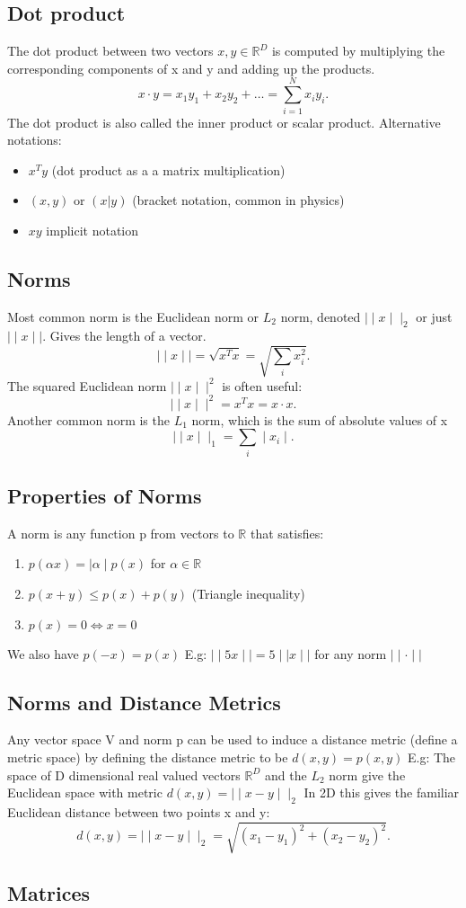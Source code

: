 \documentclass[a4paper]{article}
\newcommand{\R}{\mathbb{R}}
\begin{document}
	\subsection{Dot product}
	The dot product between two vectors $x,y \in \R^D$ is computed by multiplying the
	corresponding components of x and y and adding up the products.
	\[
	x\cdot y = x_1 y_1 + x_2 y_2 + \ldots = \sum_{i=1}^{N} x_i y_i
	.\] 
	The dot product is also called the inner product or scalar product.
	Alternative notations:
	 \begin{itemize}
		 \item $x^T y$ (dot product as a a matrix multiplication)
		 \item $(x,y)$ or $(x|y)$ (bracket notation, common in physics)
		 \item $xy$ implicit notation
	\end{itemize}
	\subsection{Norms}
	Most common norm is the Euclidean norm or $L_2$ norm, denoted $\mid\mid x\mid\mid_2$
	or just $ \mid  \mid x \mid  \mid $.
	Gives the length of a vector.
	\[
	\mid  \mid x \mid  \mid = \sqrt{x^T x} = \sqrt{\sum_{i}x_i^2} 
	.\] 
	The squared Euclidean norm $ \mid  \mid x \mid  \mid^2$ is often useful:
	\[
	 \mid  \mid x \mid  \mid^2 = x^Tx = x\cdot x
	.\] 
	Another common norm is the $L_1$ norm, which is the sum of absolute values of x
	\[
		\mid  \mid x \mid  \mid_1 = \sum_{i} \mid x_i \mid 
	.\] 
	\subsection{Properties of Norms}
	A norm is any function p from vectors to $\R$ that satisfies:
	\begin{enumerate}
		\item $p(\alpha x) =  \mid \alpha  \mid p(x)$ for $\alpha \in \R$ 
		\item $p(x+y) \le p(x) + p(y)$ (Triangle inequality)
		\item $p(x) = 0 \iff x = 0$
	\end{enumerate}
	We also have $p(-x) = p(x)$
	E.g: $ \mid  \mid 5x \mid  \mid = 5  \mid \mid x  \mid \mid$ for any norm $ \mid  \mid \cdot  \mid  \mid $
	\subsection{Norms and Distance Metrics}
	Any vector space V and norm p can be used to induce a distance metric (define a metric
	space) by defining the distance metric to be $d(x,y) = p(x,y)$ 
	E.g: The space of D dimensional real valued vectors $\R^D$ and the $L_2$ norm give the 
	Euclidean space with metric $d(x,y) =  \mid  \mid x - y  \mid  \mid_2$
	In 2D this gives the familiar Euclidean distance between two points x and y:
	\[
		d(x,y) =  \mid  \mid x-y \mid  \mid_2 = \sqrt{(x_1-y_1)^2+(x_2-y_2)^2} 
	.\] 
	\subsection{Matrices}
\end{document}
